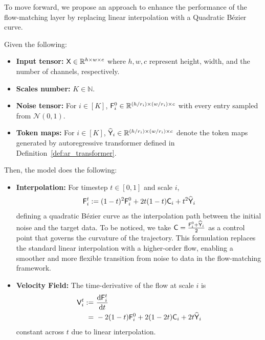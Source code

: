 To move forward, we propose an approach to enhance the performance of the flow-matching layer by replacing linear interpolation with a Quadratic Bézier curve.

\begin{definition}\label{def:high_order_flow}
Given the following:
\begin{itemize}
    \item {\bf Input tensor:} $\mathsf{X} \in \mathbb{R}^{h \times w \times c}$ where $h,w,c$ represent height, width, and the number of channels, respectively.
    \item {\bf Scales number:} $K \in \mathbb{N}$.
    \item {\bf Noise tensor: } For $i \in [K]$, $\mathsf{F}_i^0 \in \mathbb{R}^{(h / r_i) \times (w/r_i) \times c}$ with every entry sampled from $\mathcal{N}(0,1)$.
    \item {\bf Token maps:} For $i \in [K]$, $\widehat{\mathsf{Y}}_i \in \mathbb{R}^{(h / r_i) \times (w/r_i) \times c}$ denote the token maps generated by autoregressive transformer defined in Definition~\ref{def:ar_transformer}.
\end{itemize}
Then, the model does the following:
\begin{itemize}
    \item {\bf Interpolation:} For timestep $t \in [0,1]$ and scale $i$,
    \begin{align*}
        \mathsf{F}_i^t := (1-t)^2 \mathsf{F}_i^0 + 2t(1-t) \mathsf{C}_i + t^2 \widehat{\mathsf{Y}}_i
    \end{align*}
    defining a quadratic Bézier curve as the interpolation path between the initial noise and the target data. To be noticed, we take $\mathsf{C} = \frac{\mathsf{F}_i^0+\widehat{\mathsf{Y}}_i}{2}$ as a control point that governs the curvature of the trajectory. This formulation replaces the standard linear interpolation with a higher-order flow, enabling a smoother and more flexible transition from noise to data in the flow-matching framework.
    \item {\bf Velocity Field:} The time-derivative of the flow at scale $i$ is 
    \begin{align*}
        \mathsf{V}^t_i := &~\frac{\mathrm{d} \mathsf{F}^t_{i}}{\mathrm{d} t}\\ =&~ -2(1-t)\mathsf{F}_i^0 + 2(1-2t) \mathsf{C}_i + 2t \widehat{\mathsf{Y}}_i 
    \end{align*}
    constant across $t$ due to linear interpolation.
\end{itemize}
\end{definition}

